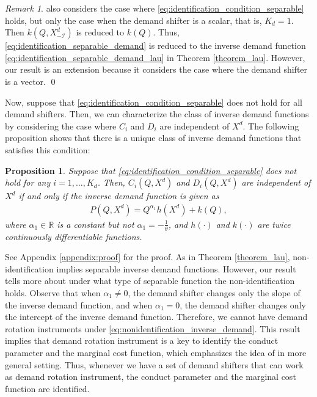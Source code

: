 \documentclass[11pt, a4paper]{article}
\newtheorem{proposition}{Proposition}
\theoremstyle{remark}
\newtheorem{remark}{Remark}
\begin{document}
\begin{remark}
    \citet{lau1982identifying} also considers the case where \eqref{eq:identification_condition_separable} holds, but only the case when the demand shifter is a scalar, that is, $K_d = 1$.
    Then $k(Q, X^{d}_{-\mathcal{I}})$ is reduced to $k(Q)$.
    Thus, \eqref{eq:identification_separable_demand} is reduced to the inverse demand function \eqref{eq:identification_separable_demand_lau} in Theorem \ref{theorem_lau}.
    However, our result is an extension because it considers the case where the demand shifter is a vector. \qed
\end{remark}

Now, suppose that \eqref{eq:identification_condition_separable} does not hold for all demand shifters.
Then, we can characterize the class of inverse demand functions by considering the case where $C_i$ and $D_i$ are independent of $X^{d}$.
The following proposition shows that there is a unique class of inverse demand functions that satisfies this condition:
\begin{proposition}\label{proposition:nonidentification_inverse_demand}
    Suppose that \eqref{eq:identification_condition_separable} does not hold for any $i = 1, \ldots, K_d$.
    Then, $C_i(Q, X^{d})$ and $D_i(Q, X^{d})$ are independent of $X^{d}$ if and only if the inverse demand function is given as \begin{align}
        P(Q, X^{d}) = Q^{\alpha_1}h(X^{d}) + k(Q), \label{eq:nonidentification_inverse_demand}
    \end{align}
    where $\alpha_1 \in \mathbb{R}$ is a constant but not $\alpha_1 = -\frac{1}{\theta}$, and $h(\cdot)$ and $k(\cdot)$ are twice continuously differentiable functions.
\end{proposition}
See Appendix \ref{appendix:proof} for the proof.
As in Theorem \ref{theorem_lau}, non-identification implies separable inverse demand functions.
However, our result tells more about under what type of separable function the non-identification holds.
Observe that when $\alpha_1 \ne 0$, the demand shifter changes only the slope of the inverse demand function, and when $\alpha_1 = 0$, the demand shifter changes only the intercept of the inverse demand function.
Therefore, we cannot have demand rotation instruments under \eqref{eq:nonidentification_inverse_demand}.
This result implies that demand rotation instrument is a key to identify the conduct parameter and the marginal cost function, which emphasizes the idea of \citet{bresnahan1982oligopoly} in more general setting.
Thus, whenever we have a set of demand shifters that can work as demand rotation instrument, the conduct parameter and the marginal cost function are identified.
\end{document}
